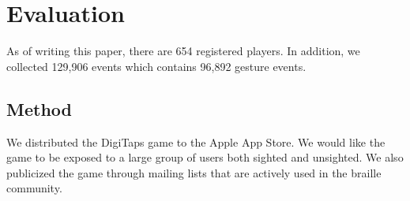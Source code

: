\section{Evaluation}
\label{sec:data_eval}
As of writing this paper, there are 654 registered players. In addition, we collected 129,906 events which contains 96,892 gesture events.

\subsection{Method}
We distributed the DigiTaps game to the Apple App Store. We would like the game to be exposed to a large group of users both sighted and unsighted. We also publicized the game through mailing lists that are actively used in the braille community. 

